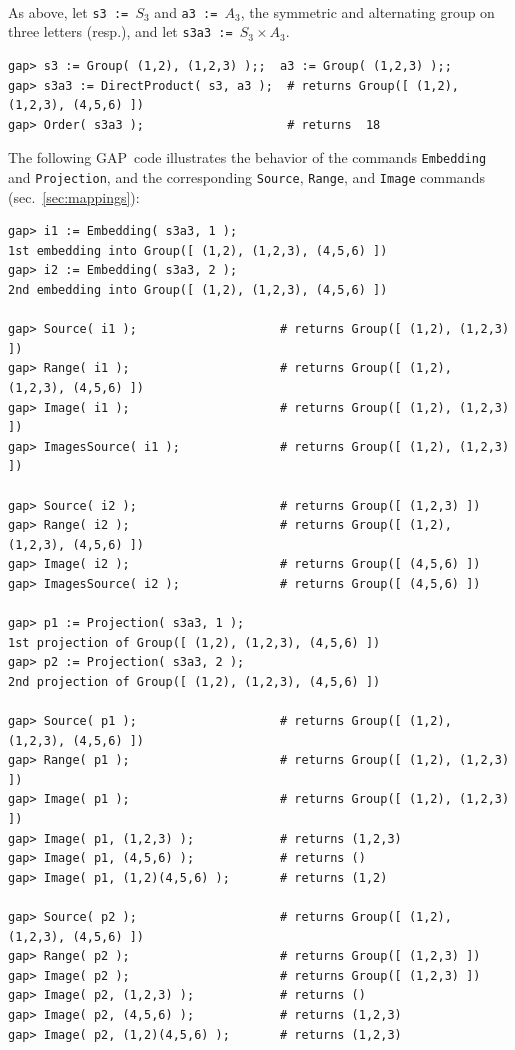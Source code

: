 \documentclass[11pt]{amsart}
\newcommand{\gap}{GAP}   %
\theoremstyle{plain}
\newcommand{\codesize}{\footnotesize}
\newcommand{\<}{\ensuremath{\langle}}
\renewcommand{\>}{\ensuremath{\rangle}}
\begin{document}
\\[6pt]
As above, let 
{\tt s3 := $S_3$} and {\tt a3 := $A_3$}, 
the symmetric and alternating group on three letters (resp.), and let 
{\tt s3a3 := $S_3\times A_3$}.
{\codesize
\begin{verbatim}
gap> s3 := Group( (1,2), (1,2,3) );;  a3 := Group( (1,2,3) );;
gap> s3a3 := DirectProduct( s3, a3 );  # returns Group([ (1,2), (1,2,3), (4,5,6) ])
gap> Order( s3a3 );                    # returns  18

\end{verbatim}}
\noindent The following \gap\ code illustrates the behavior of the commands 
{\tt Embedding} and {\tt Projection}, and the corresponding {\tt Source}, 
{\tt Range}, and {\tt Image} commands (sec.~\ref{sec:mappings}): 
{\codesize
\begin{verbatim}
gap> i1 := Embedding( s3a3, 1 );
1st embedding into Group([ (1,2), (1,2,3), (4,5,6) ])
gap> i2 := Embedding( s3a3, 2 );
2nd embedding into Group([ (1,2), (1,2,3), (4,5,6) ])

gap> Source( i1 );                    # returns Group([ (1,2), (1,2,3) ])
gap> Range( i1 );                     # returns Group([ (1,2), (1,2,3), (4,5,6) ])
gap> Image( i1 );                     # returns Group([ (1,2), (1,2,3) ])
gap> ImagesSource( i1 );              # returns Group([ (1,2), (1,2,3) ])

gap> Source( i2 );                    # returns Group([ (1,2,3) ])
gap> Range( i2 );                     # returns Group([ (1,2), (1,2,3), (4,5,6) ])
gap> Image( i2 );                     # returns Group([ (4,5,6) ])
gap> ImagesSource( i2 );              # returns Group([ (4,5,6) ])

gap> p1 := Projection( s3a3, 1 );
1st projection of Group([ (1,2), (1,2,3), (4,5,6) ])
gap> p2 := Projection( s3a3, 2 );
2nd projection of Group([ (1,2), (1,2,3), (4,5,6) ])

gap> Source( p1 );                    # returns Group([ (1,2), (1,2,3), (4,5,6) ])
gap> Range( p1 );                     # returns Group([ (1,2), (1,2,3) ])
gap> Image( p1 );                     # returns Group([ (1,2), (1,2,3) ])
gap> Image( p1, (1,2,3) );            # returns (1,2,3)
gap> Image( p1, (4,5,6) );            # returns ()
gap> Image( p1, (1,2)(4,5,6) );       # returns (1,2)

gap> Source( p2 );                    # returns Group([ (1,2), (1,2,3), (4,5,6) ])
gap> Range( p2 );                     # returns Group([ (1,2,3) ])
gap> Image( p2 );                     # returns Group([ (1,2,3) ])
gap> Image( p2, (1,2,3) );            # returns ()
gap> Image( p2, (4,5,6) );            # returns (1,2,3)
gap> Image( p2, (1,2)(4,5,6) );       # returns (1,2,3)


\end{verbatim}}
\end{document}
